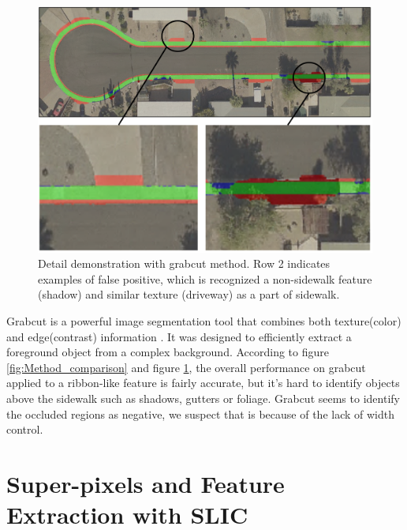 \begin{figure}[H]
    \centering
    \includegraphics[width=\textwidth]{Figures/grabcut_sample.png}
    \caption[Example of Grabcut]{Detail demonstration with grabcut method. Row 2 indicates examples of false positive, which is recognized a non-sidewalk feature (shadow) and similar texture (driveway) as a part of sidewalk.}
    \label{fig:grabcut}
\end{figure}

Grabcut is a powerful image segmentation tool that combines both texture(color) and edge(contrast) information \cite{Rother2004-ou}. It was designed to efficiently extract a foreground object from a complex background. According to figure \ref{fig:Method_comparison} and figure \ref{fig:grabcut}, the overall performance on grabcut applied to a ribbon-like feature is fairly accurate, but it's hard to identify objects above the sidewalk such as shadows, gutters or foliage. Grabcut seems to identify the occluded regions as negative, we suspect that is because of the lack of width control.

\section {Super-pixels and Feature Extraction with SLIC}

